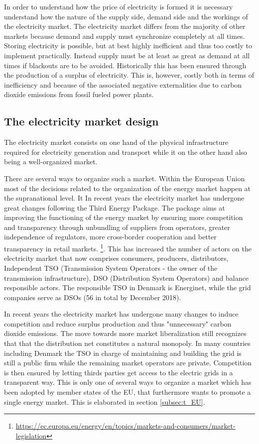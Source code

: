 \label{sec:theory}
In order to understand how the price of electricity is formed it is necessary understand how the nature of the supply side, demand side and the workings of the electricity market. The electricity market differs from the majority of other markets because demand and supply must synchronize completely at all times. Storing electricity is possible, but at best highly inefficient and thus too costly to implement practically. Instead supply must be at least as great as demand at all times if blackouts are to be avoided. Historically this has been ensured through the production of a surplus of electricity. This is, however, costly both in terms of inefficiency and because of the associated negative externalities due to carbon dioxide emissions from fossil fueled power plants.


\subsection{The electricity market design}
\label{subsec:t_market}
The electricity market consists on one hand of the physical infrastructure required for electricity generation and transport while it on the other hand also being a well-organized market. \bigskip \par
There are several ways to organize such a market. Within the European Union most of the decisions related to the organization of the energy market happen at the supranational level. It In recent years the electricity market has undergone great changes following the Third Energy Package. The package aims at improving the functioning of the energy market by ensuring more competition and transparency through unbundling of suppliers from operators, greater independence of regulators, more cross-border cooperation and better transparency in retail markets. \footnote{\url{https://ec.europa.eu/energy/en/topics/markets-and-consumers/market-legislation}}. This has increased the number of actors on the electricity market that now comprises consumers, producers, distributors, Independent TSO (Transmission System Operators - the owner of the transmission infrastructure), DSO (Distribution System Operators) and balance responsible actors. The responsible TSO in Denmark is Energinet, while the grid companies serve as DSOs (56 in total by December 2018).
\bigskip \par
In recent years the electricity market has undergone many changes to induce competition and reduce surplus production and thus "unnecessary" carbon dioxide emissions. The move towards more market liberalization still recognizes that that the distribution net constitutes a natural monopoly. In many countries including Denmark the TSO in charge of maintaining and building the grid is still a public firm while the remaining market operators are private. Competition is then ensured by letting thirds parties get access to the electric grids in a transparent way. This is only one of several ways to organize a market which has been adopted by member states of the EU, that furthermore wants to promote a single energy market. This is elaborated in section \ref{subsec:t_EU}.
\par

